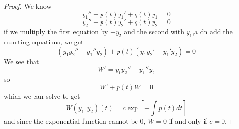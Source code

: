     \begin{proof}
        We know
        $$y_1'' + p(t)y_1' + q(t)y_1 = 0$$
        $$y_2'' + p(t)y_2' + q(t)y_2 = 0$$
        if we multiply the first equation by $-y_2$ and the second with $y_1$,a dn add the resulting equations, we get
        $$(y_1y_2'' - y_1''y_2) + p(t)(y_1y_2' - y_1'y_2) = 0$$
        We see that 
        $$W' = y_1y_2'' - y_1''y_2$$
        so
        $$W' + p(t)W = 0$$
        which we can solve to get
        \begin{equation*}
            W(y_1, y_2)(t) = c\exp[-\int p(t)dt]
        \end{equation*}
        and since the exponential function cannot be 0, $W = 0$ if and only if $c = 0$.
    \end{proof}
